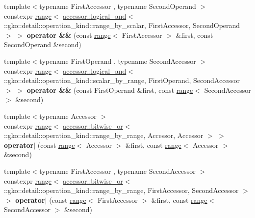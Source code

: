 \begin{DoxyCompactItemize}
\item 
\mbox{\label{namespacegko_a0a6d32f6862dc99898c3a4fdb26ca654}} 
{\footnotesize template$<$typename First\+Accessor , typename Second\+Operand $>$ }\\constexpr \hyperlink{classgko_1_1range}{range}$<$ \hyperlink{structgko_1_1accessor_1_1logical__and}{accessor\+::logical\+\_\+and}$<$ \+::gko\+::detail\+::operation\+\_\+kind\+::range\+\_\+by\+\_\+scalar, First\+Accessor, Second\+Operand $>$ $>$ {\bfseries operator \&\&} (const \hyperlink{classgko_1_1range}{range}$<$ First\+Accessor $>$ \&first, const Second\+Operand \&second)
\item 
\mbox{\label{namespacegko_a0cd6b64fc7c55504465571a46638902c}} 
{\footnotesize template$<$typename First\+Operand , typename Second\+Accessor $>$ }\\constexpr \hyperlink{classgko_1_1range}{range}$<$ \hyperlink{structgko_1_1accessor_1_1logical__and}{accessor\+::logical\+\_\+and}$<$ \+::gko\+::detail\+::operation\+\_\+kind\+::scalar\+\_\+by\+\_\+range, First\+Operand, Second\+Accessor $>$ $>$ {\bfseries operator \&\&} (const First\+Operand \&first, const \hyperlink{classgko_1_1range}{range}$<$ Second\+Accessor $>$ \&second)
\item 
\mbox{\label{namespacegko_aa83739f5164d2c071abe69bb4fb89203}} 
{\footnotesize template$<$typename Accessor $>$ }\\constexpr \hyperlink{classgko_1_1range}{range}$<$ \hyperlink{structgko_1_1accessor_1_1bitwise__or}{accessor\+::bitwise\+\_\+or}$<$ \+::gko\+::detail\+::operation\+\_\+kind\+::range\+\_\+by\+\_\+range, Accessor, Accessor $>$ $>$ {\bfseries operator$\vert$} (const \hyperlink{classgko_1_1range}{range}$<$ Accessor $>$ \&first, const \hyperlink{classgko_1_1range}{range}$<$ Accessor $>$ \&second)
\item 
\mbox{\label{namespacegko_ab4bc92ac2122a4fc41a92003bfaf9c4c}} 
{\footnotesize template$<$typename First\+Accessor , typename Second\+Accessor $>$ }\\constexpr \hyperlink{classgko_1_1range}{range}$<$ \hyperlink{structgko_1_1accessor_1_1bitwise__or}{accessor\+::bitwise\+\_\+or}$<$ \+::gko\+::detail\+::operation\+\_\+kind\+::range\+\_\+by\+\_\+range, First\+Accessor, Second\+Accessor $>$ $>$ {\bfseries operator$\vert$} (const \hyperlink{classgko_1_1range}{range}$<$ First\+Accessor $>$ \&first, const \hyperlink{classgko_1_1range}{range}$<$ Second\+Accessor $>$ \&second)

\end{DoxyCompactItemize}
